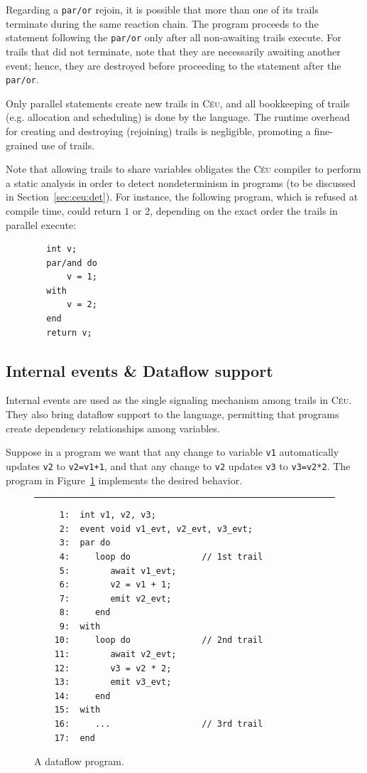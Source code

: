 \documentclass[11pt,a4paper]{article}
\newcommand{\2}{\;\;}
\newcommand{\5}{\;\;\;\;\;}
\newcommand{\CEU}{\textsc{C\'{e}u}}
\newcommand{\code}[1] {{\small{\texttt{#1}}}}
\begin{document}
Regarding a \code{par/or} rejoin, it is possible that more than one of its 
trails terminate during the same reaction chain.
The program proceeds to the statement following the \code{par/or} only after 
all non-awaiting trails execute.
For trails that did not terminate, note that they are necessarily awaiting 
another event; hence, they are destroyed before proceeding to the statement 
after the \code{par/or}.

Only parallel statements create new trails in \CEU{}, and all bookkeeping of 
trails (e.g. allocation and scheduling) is done by the language.
The runtime overhead for creating and destroying (rejoining) trails is 
negligible, promoting a fine-grained use of trails.

Note that allowing trails to share variables obligates the \CEU{} compiler to 
perform a static analysis in order to detect nondeterminism in programs (to be 
discussed in Section~\ref{sec:ceu:det}).
For instance, the following program, which is refused at compile time, could 
return $1$ or $2$, depending on the exact order the trails in parallel execute:
{\small
\begin{verbatim}
        int v;
        par/and do
            v = 1;
        with
            v = 2;
        end
        return v;
\end{verbatim}
}

\subsection{Internal events \& Dataflow support}
\label{sec:ceu:frp}

Internal events are used as the single signaling mechanism among trails in 
\CEU{}.
They also bring dataflow support to the language, permitting that programs 
create dependency relationships among variables.

Suppose in a program we want that any change to variable \code{v1} 
automatically updates \code{v2} to \code{v2=v1+1}, and that any change to 
\code{v2} updates \code{v3} to \code{v3=v2*2}.
The program in Figure~\ref{lst:ceu:frp:1} implements the desired behavior.


\begin{figure}[h]
\rule{15cm}{0.37pt}
{\small
\begin{verbatim}
     1:  int v1, v2, v3;
     2:  event void v1_evt, v2_evt, v3_evt;
     3:  par do
     4:     loop do              // 1st trail
     5:        await v1_evt;
     6:        v2 = v1 + 1;
     7:        emit v2_evt;
     8:     end
     9:  with
    10:     loop do              // 2nd trail
    11:        await v2_evt;
    12:        v3 = v2 * 2;
    13:        emit v3_evt;
    14:     end
    15:  with
    16:     ...                  // 3rd trail
    17:  end
\end{verbatim}
}
\caption{ A dataflow program.
\label{lst:ceu:frp:1}
}
\end{figure}
\end{document}
